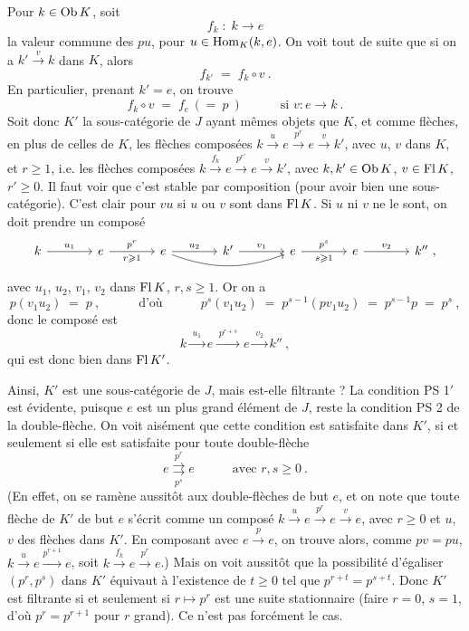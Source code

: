 
Pour $k \in \operatorname{Ob} K$, soit
\[ f_k \;:\; k \longrightarrow e \]
la valeur commune des $pu$, pour $u \in \operatorname{Hom}_K(k,e)$. On voit tout de suite que si on a $k' \xrightarrow{v} k$ dans $K$, alors
\[ f_{k'} \;=\; f_k \circ v \ . \]
En particulier, prenant $k' = e$, on trouve
\[ f_k \circ v \;=\; f_e \,(=\ p\ ) \qquad\quad \text{si } v : e \longrightarrow k \ . \]
Soit donc $K'$ la sous-catégorie de $J$ ayant mêmes objets que $K$, et comme flèches, en plus de celles de $K$, les flèches composées $k \xrightarrow{u} e \xrightarrow{p^r} e \xrightarrow{v} k'$, avec $u$, $v$ dans $K$, et $r \geqslant 1$, i.e. les flèches composées $k \xrightarrow{f_k} e \xrightarrow{p^{r'}} e \xrightarrow{v} k'$, avec $k, k' \in \operatorname{Ob} K$, $v \in \operatorname{Fl} K$, $r' \geqslant 0$. Il faut voir que c'est stable par composition (pour avoir bien une sous-catégorie). C'est clair pour $vu$ si $u$ ou $v$ sont dans $\operatorname{Fl} K$. Si $u$ ni $v$ ne le sont, on doit prendre un composé
\[
\begin{tikzcd}[column sep=large]
k \arrow[r, "u_1"] & e \arrow[r, "p^r", "r\geqslant 1"'] & e \arrow[r, "u_2"] \arrow[rr, bend right=20] & k' \arrow[r, "v_1"] & e \arrow[r, "p^s", "s\geqslant 1"'] & e \arrow[r, "v_2"] & k'' \ ,
\end{tikzcd}
\]
avec $u_1$, $u_2$, $v_1$, $v_2$ dans $\operatorname{Fl} K$, $r, s \geqslant 1$. Or on a
\[ p(v_1u_2) \;=\; p \ , \qquad\quad \text{d'où} \qquad\quad p^s(v_1u_2) \;=\; p^{s-1}(pv_1u_2) \;=\; p^{s-1}p \;=\; p^s \ , \]
donc le composé est
\[ k \xrightarrow{\;u_1\;} e \xrightarrow{\;p^{r+s}\;} e \xrightarrow{\;v_2\;} k'' \ , \]
qui
est donc bien dans $\operatorname{Fl} K'$.

Ainsi, $K'$ est une sous-catégorie de $J$, mais est-elle filtrante ? La condition PS 1$'$ est évidente, puisque $e$ est un plus grand élément de $J$, reste la condition PS 2 de la double-flèche. On voit aisément que cette condition est satisfaite dans $K'$, si et seulement si elle est satisfaite pour toute double-flèche
\[ e \overset{p^r}{\underset{p^s}{\rightrightarrows}} e \qquad\quad \text{avec } r, s \geqslant 0 \ . \]
(En effet, on se ramène aussitôt aux double-flèches de but $e$, et on note que toute flèche de $K'$ de but $e$ s'écrit comme un composé $k \xrightarrow{u} e \xrightarrow{p^r} e \xrightarrow{v} e$, avec $r \geqslant 0$ et $u$, $v$ des flèches dans $K'$. En composant avec $e \xrightarrow{p} e$, on trouve alors, comme $pv = pu$, $k \xrightarrow{u} e \xrightarrow{p^{r+1}} e$, soit $k \xrightarrow{f_k} e \xrightarrow{p^r} e$.) Mais on voit aussitôt que la possibilité d'égaliser $(p^r, p^s)$ dans $K'$ équivaut à l'existence de $t \geqslant 0$ tel que $p^{r+t} = p^{s+t}$. Donc $K'$ est filtrante si et seulement si $r \longmapsto p^r$ est une suite stationnaire (faire $r = 0$, $s = 1$, d'où $p^r = p^{r+1}$ pour $r$ grand). Ce n'est
pas forcément le cas.

